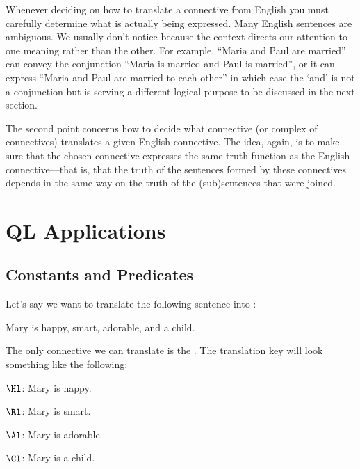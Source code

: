 Whenever deciding on how to translate a connective from English you must carefully determine what is actually being expressed. Many English sentences are ambiguous.  We usually don’t notice because the context directs our attention to one meaning rather than the other.  For example, ``Maria and Paul are married'' can convey the conjunction ``Maria is married and Paul is married'', or it can express ``Maria and Paul are married to each other'' in which case the `and' is not a conjunction but is serving a different logical purpose to be discussed in the next section.

The second point concerns how to decide what \GSL{} connective (or complex of connectives) translates a given English connective. 
The idea, again, is to make sure that the chosen \GSL{} connective expresses the same truth function as the English connective---that is, that the truth of the sentences formed by these connectives depends in the same way on the truth of the (sub)sentences that were joined. 
  

\section{QL Applications}

\subsection{Constants and Predicates}
Let's say we want to translate the following sentence into \emph{\GSL{}}:

\begin{smenumerate}
	\item\label{GQLTrans1} Mary is happy, smart, adorable, and a child.
\end{smenumerate}

\noindent{}The only connective we can translate is the .  The translation key will look something like the following:

\begin{description}[itemsep=0em]
	\item[Translation Key:] \hfill{} 
	\begin{description}[itemsep=0em]
		\item[] $\Hl$: Mary is happy.
		\item[] $\Rl$: Mary is smart. 
		\item[] $\Al$: Mary is adorable.
		\item[] $\Cl$: Mary is a child.  
	\end{description}
\end{description}

